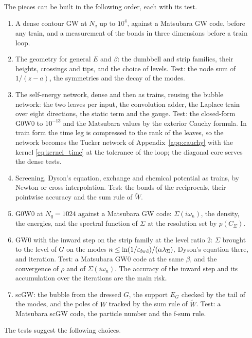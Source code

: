 \documentclass[aps,prb,reprint,a4paper]{revtex4-2}
\begin{document}
The pieces can be built in the following order, each with its test.
\begin{enumerate}
  \item A dense contour GW at $N_q$ up to $10^4$, against a Matsubara GW code, before any train, and a measurement of the bonds in three dimensions before a train loop.
  \item The geometry for general $E$ and $\beta$: the dumbbell and strip families, their heights, crossings and tips, and the choice of levels. Test: the node sum of $1/(z-a)$, the symmetries and the decay of the modes.
  \item The self-energy network, dense and then as trains, reusing the bubble network: the two leaves per input, the convolution adder, the Laplace train over eight directions, the static term and the gauge. Test: the closed-form G0W0 to $10^{-13}$ and the Matsubara values by the exterior Cauchy formula. In train form the time leg is compressed to the rank of the leaves, so the network becomes the Tucker network of Appendix~\ref{app:cauchy} with the kernel \eqref{eq:kernel_time} at the tolerance of the loop; the diagonal core serves the dense tests.
  \item Screening, Dyson's equation, exchange and chemical potential as trains, by Newton or cross interpolation. Test: the bonds of the reciprocals, their pointwise accuracy and the sum rule of $\tilde W$.
  \item G0W0 at $N_q=1024$ against a Matsubara GW code: $\Sigma(i\omega_n)$, the density, the energies, and the spectral function of $\Sigma$ at the resolution set by $p(C_\Sigma)$.
  \item GW0 with the inward step on the strip family at the level ratio 2: $\Sigma$ brought to the level of $G$ on the modes $n\le\ln(1/\varepsilon_{\rm fwd})/(\alpha\lambda_\Sigma)$, Dyson's equation there, and iteration. Test: a Matsubara GW0 code at the same $\beta$, and the convergence of $\rho$ and of $\Sigma(i\omega_n)$. The accuracy of the inward step and its accumulation over the iterations are the main risk.
  \item scGW: the bubble from the dressed $G$, the support $E_G$ checked by the tail of the modes, and the poles of $W$ tracked by the sum rule of $\tilde W$. Test: a Matsubara scGW code, the particle number and the f-sum rule.
\end{enumerate}
The tests suggest the following choices.
\end{document}
